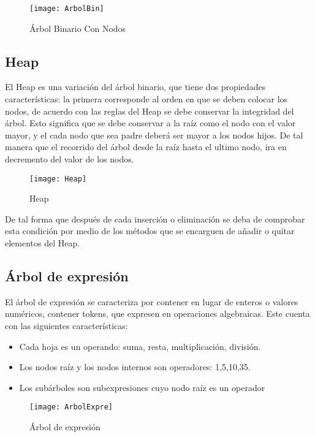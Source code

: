 \documentclass[12pt,a4paper]{article}
\begin{document}
		\begin{figure}[h]
			\centering
			\texttt{[image: ArbolBin]}
			\caption{Árbol Binario Con Nodos}
		\end{figure}
	
		\subsection{Heap}

	El Heap es una variación del árbol binario, que tiene dos propiedades características: la primera corresponde al orden en que se deben colocar los nodos, de acuerdo con las reglas del Heap se debe conservar la integridad del árbol. Esto significa que se debe conservar a la raíz como el nodo con el valor mayor, y el cada nodo que sea padre deberá ser mayor a los nodos hijos. De tal manera que el recorrido del árbol desde la raíz hasta el ultimo nodo, ira en decremento del valor de los nodos.
	
		\begin{figure}[h]
			\centering
			\texttt{[image: Heap]}
			\caption{Heap}
		\end{figure}

	De tal forma que después de cada inserción o eliminación se deba de comprobar esta condición por medio de los métodos que se encarguen de añadir o quitar elementos del Heap.
	
		\subsection{Árbol de expresión}
		
	El árbol de expresión se caracteriza por contener en lugar de enteros o valores numéricos, contener tokens, que expresen en operaciones algebraicas. Este cuenta con las siguientes características: 
	
\begin{itemize}
\item Cada hoja es un operando: suma, resta, multiplicación, 				  división.
\item Los nodos raíz y los nodos internos son operadores: 1,5,10,35.
\item Los subárboles son subexpresiones cuyo nodo raíz es un operador
\end{itemize}
		
		\begin{figure}[h]
			\centering
			\texttt{[image: ArbolExpre]}
			\caption{Árbol de expresión}
		\end{figure}
		
\end{document}
